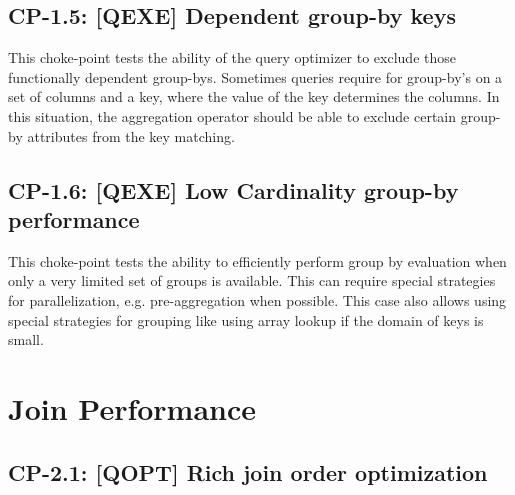 

\subsection*{CP-1.5: [QEXE] Dependent group-by keys}
\label{choke_point_1.5}


This choke-point tests the ability of the query optimizer to exclude those functionally dependent group-bys. Sometimes queries require for group-by's on a set of columns and a key, where the value of the key determines the columns.
In this situation, the aggregation operator should be able to exclude certain group-by attributes from the key matching.



\subsection*{CP-1.6: [QEXE] Low Cardinality group-by performance}
\label{choke_point_1.6}


This choke-point tests the ability to efficiently perform group by evaluation when only a very limited set of groups is available.  This can require special strategies for parallelization, e.g. pre-aggregation when possible. This case also allows using special strategies for grouping like using array lookup if the domain of keys is small.





\section{Join Performance}

\subsection*{CP-2.1: [QOPT] Rich join order optimization}
\label{choke_point_2.1}



